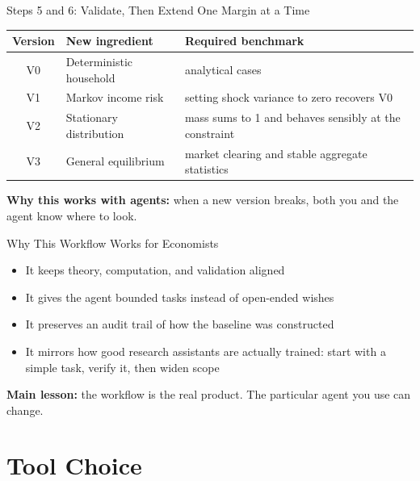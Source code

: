 \documentclass[10pt,english,aspectratio=169]{beamer}
\begin{document}
\begin{frame}{Steps 5 and 6: Validate, Then Extend One Margin at a Time}
\begin{center}
\small
\begin{tabular}{|c|p{3.3cm}|p{4.2cm}|}
\hline
\textbf{Version} & \textbf{New ingredient} & \textbf{Required benchmark} \\ \hline
V0 & Deterministic household & analytical cases \\ \hline
V1 & Markov income risk & setting shock variance to zero recovers V0 \\ \hline
V2 & Stationary distribution & mass sums to 1 and behaves sensibly at the constraint \\ \hline
V3 & General equilibrium & market clearing and stable aggregate statistics \\ \hline
\end{tabular}
\end{center}

\vspace{0.25cm}

\textbf{Why this works with agents:} when a new version breaks, both you and the agent know where to look.
\end{frame}

\begin{frame}{Why This Workflow Works for Economists}
\begin{itemize}
    \item It keeps theory, computation, and validation aligned
    \item It gives the agent bounded tasks instead of open-ended wishes
    \item It preserves an audit trail of how the baseline was constructed
    \item It mirrors how good research assistants are actually trained: start with a simple task, verify it, then widen scope
\end{itemize}

\vspace{0.3cm}

\textbf{Main lesson:} the workflow is the real product. The particular agent you use can change.
\end{frame}

\section{Tool Choice}
\end{document}
